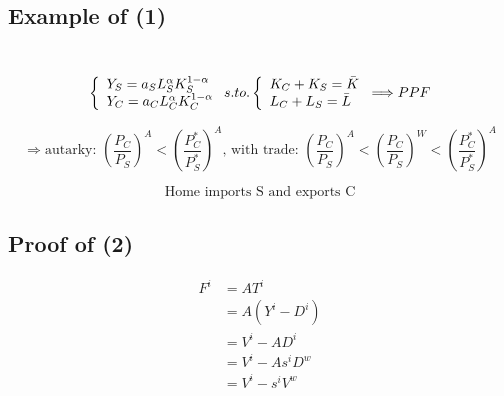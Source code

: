 \documentclass{article}
\begin{document}
\subsection{Example of (1)}\\
\begin{equation*}
\left\{
             \begin{array}{lc}
             Y_S = a_SL_S^\alpha K_S^{1-\alpha}\\
             Y_C = a_CL_C^\alpha K_C^{1-\alpha}
             \end{array}
\right.
s.to.
\left\{
             \begin{array}{lc}
             K_C+K_S=\Bar{K}\\
             L_C+L_S=\Bar{L}
             \end{array}
\right.
\Longrightarrow PPF
\end{equation*}

\begin{equation*}
\Longrightarrow
             \text{autarky: }\left(\frac{P_C}{P_S}\right)^A<\left(\frac{P_C^*}{P_S^*}\right)^A
             \text{, with trade: }\left(\frac{P_C}{P_S}\right)^A<\left(\frac{P_C}{P_S}\right)^W<\left(\frac{P_C^*}{P_S^*}\right)^A
\end{equation*}

$$\text{Home imports S and exports C}$$

\subsection{Proof of (2)}
\begin{equation*}
    \begin{split}
        F^i &= A T^i\\
        &= A(Y^i-D^i)\\
        &= V^i-AD^i\\
        &= V^i-As^iD^w\\
        &= V^i-s^iV^w\\
    \end{split}
\end{equation*}
\end{document}

